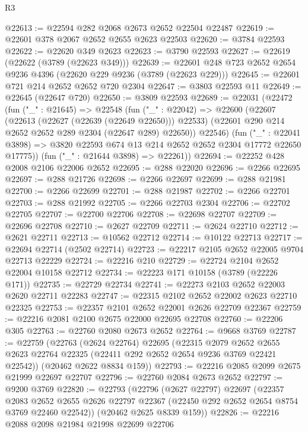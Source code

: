 \begin{lexlean}{R3}
\begin{coremodule}
@22613 := @22594 @282 @2068 @2673 @2652 @22504 @22487
@22619 := @22601 @378 @2067 @2652 @2655 @2623 @22503
@22620 := @3784 @22593
@22622 := @22620 @349 @2623
@22623 := @3790 @22593
@22627 := @22619 (@22622 (@3789 (@22623 @349)))
@22639 := @22601 @248 @723 @2652 @2654 @9236 @4396 (@22620 @229 @9236 (@3789 (@22623 @229)))
@22645 := @22601 @721 @214 @2652 @2652 @720 @2304
@22647 := @3803 @22593 @11
@22649 := @22645 (@22647 @720)
@22650 := @3809 @22593
@22689 := @22031
    (@22472
      (fun ("_" : @21645) =>
      @22548
        (fun ("_" : @22042) =>
        @22600
          (@22607
            (@22613 (@22627 (@22639 (@22649 @22650))) @22533)
            (@22601 @290 @214 @2652 @2652 @289 @2304 (@22647 @289) @22650))
          @22546)
        (fun ("_" : @22041 @3898) =>
        @3820 @22593 @674 @13 @214 @2652 @2652 @2304 @17772 @22650 @17775))
      (fun ("_" : @21644 @3898) => @22261))
@22694 := @22252 @428 @2008 @2106 @22006 @2652
@22695 := @288 @22020
@22696 := @2266 @22695
@22697 := @288 @21726
@22698 := @2266 @22697
@22699 := @288 @21981
@22700 := @2266 @22699
@22701 := @288 @21987
@22702 := @2266 @22701
@22703 := @288 @21992
@22705 := @2266 @22703 @2304
@22706 := @22702 @22705
@22707 := @22700 @22706
@22708 := @22698 @22707
@22709 := @22696 @22708
@22710 := @2627 @22709
@22711 := @2624 @22710
@22712 := @2621 @22711
@22713 := @10562 @22712
@22714 := @10122 @22713
@22717 := @22694 @22714 (@2502 @22714)
@22723 := @22217 @2105 @2652 @22005 @9704 @22713 @22229
@22724 := @22216 @210
@22729 := @22724 @2104 @2652 @22004 @10158 @22712
@22734 := @22223 @171 @10158 (@3789 (@22226 @171))
@22735 := @22729 @22734
@22741 := @22273 @2103 @2652 @22003 @2620 @22711 @22283
@22747 := @22315 @2102 @2652 @22002 @2623 @22710 @22325
@22753 := @22357 @2101 @2652 @22001 @2626 @22709 @22367
@22759 := @22216 @2081 @2100 @2675 @22000 @22695 @22708
@22760 := @22206 @305
@22763 := @22760 @2080 @2673 @2652
@22764 := @9668 @3769
@22787 := @22759
    (@22763
      (@2624 @22764)
      @22695
      (@22315
        @2079
        @2652
        @2655
        @2623
        @22764
        @22325
        (@22411 @292 @2652 @2654 @9236 @3769 @22421 @22542))
      (@20462 @2622 @8834 @159))
@22793 := @22216 @2085 @2099 @2675 @21999 @22697 @22707
@22796 := @22760 @2084 @2673 @2652
@22797 := @9200 @3769
@22820 := @22793
    (@22796
      (@2627 @22797)
      @22697
      (@22357
        @2083
        @2652
        @2655
        @2626
        @22797
        @22367
        (@22450 @292 @2652 @2654 @8754 @3769 @22460 @22542))
      (@20462 @2625 @8339 @159))
@22826 := @22216 @2088 @2098 @21984 @21998 @22699 @22706

\end{coremodule}
\end{lexlean}
